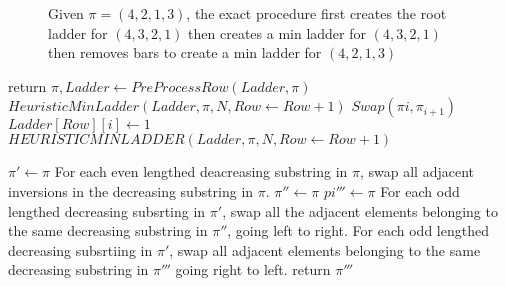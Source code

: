 \begin{figure}[!htp]
    \caption{Given $\pi=(4,2,1,3)$, the exact procedure first creates the root ladder for $(4,3,2,1)$ then creates a min ladder for $(4,3,2,1)$ then removes bars to create a min ladder for $(4,2,1,3)$}
    \label{Fig:ExactProcedure}
\end{figure}


\begin{algorithm}
        \begin{algorithmic}[1]
                    \State \small{return}
                \EndIf
                    \State \small{$\pi,Ladder \gets PreProcessRow(Ladder, \pi)$}
                    \State \small{$HeuristicMinLadder(Ladder, \pi, N, Row \gets Row+1)$}
                \Else
                            \State \small{$Swap(\pi{i}, \pi_{i+1})$}
                            \State \small{$Ladder[Row][i] \gets 1$}
                        \EndIf
                    \EndFor
                    \State \small{$HEURISTICMINLADDER(Ladder, \pi, N, Row \gets  Row+1)$}
                \EndIf


            \EndFunction


        \end{algorithmic}

         \begin{algorithmic}[1]
                \State \small{$\pi' \gets \pi$}
                \State \small{For each even lengthed deacreasing substring in $\pi$, swap all adjacent inversions in the decreasing substring in $\pi$.}
                \State \small{$\pi'' \gets \pi$}
                \State \small{$pi''' \gets \pi$}
                \State \small{For each odd lengthed decreasing subsrting in $\pi'$, swap all the adjacent elements belonging to the same decreasing substring 
                in $\pi''$, going left to right.}
                \State \small{For each odd lengthed decreasing subsrtiing in $\pi'$, swap all adjacent elements belonging to the same decreasing substring 
                in $\pi'''$ going right to left.}
                    \State return $\pi'''$
                

\end{algorithmic}
\end{algorithm}
